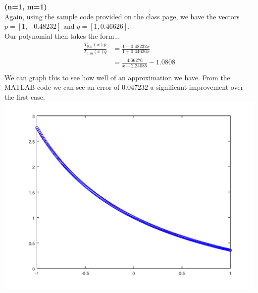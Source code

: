\documentclass[10pt]{jhwhw}
\begin{document}
	\clearpage
	\textbf{(n=1, m=1)} \\
	Again, using the sample code provided on the class page, we have
	the vectors $p=[1, -0.48232]$ and $q=[1, 0.46626]$. \\
	Our polynomial then takes the form... \\
	\begin{align*}
		\frac{T_{0,n}(x)p}{T_{0,m}(x)q} &= \frac{1 - 0.48232x}{1 + 0.44626x} \\
		&= \frac{4.66276}{x + 2.24085} - 1.0808\\
	\end{align*}
	We can graph this to see how well of an approximation we have. From the MATLAB
	code we can see an error of $0.047232$ a significant improvement over the first case.
	\includegraphics[scale=0.75]{p4b}
\end{document}
